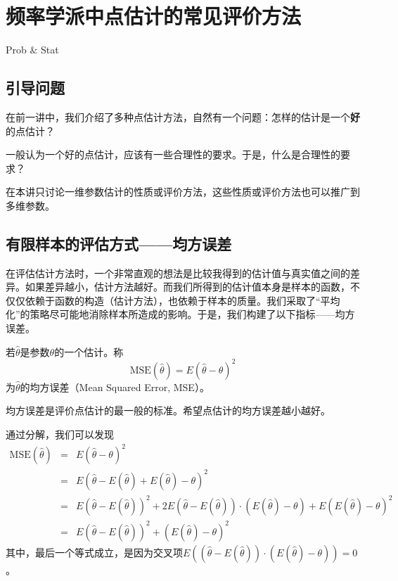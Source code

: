 \chapter{频率学派中点估计的常见评价方法}
\begin{introduction}
\item Prob $\&$ Stat 
\end{introduction}
\section{引导问题}
在前一讲中，我们介绍了多种点估计方法，自然有一个问题：怎样的估计是一个\textbf{好}的点估计？
	
一般认为一个好的点估计，应该有一些合理性的要求。于是，什么是合理性的要求？

\begin{remark}
    在本讲只讨论一维参数估计的性质或评价方法，这些性质或评价方法也可以推广到多维参数。
\end{remark}

\section{有限样本的评估方式——均方误差}

在评估估计方法时，一个非常直观的想法是比较我得到的估计值与真实值之间的差异。如果差异越小，估计方法越好。而我们所得到的估计值本身是样本的函数，不仅仅依赖于函数的构造（估计方法），也依赖于样本的质量。我们采取了“平均化”的策略尽可能地消除样本所造成的影响。于是，我们构建了以下指标——均方误差。

\begin{definition}[均方误差]
    若$\hat{\theta}$是参数$\theta$的一个估计。称
    $$
    \text{MSE}(\hat{\theta}) = E(\hat{\theta}-\theta)^2
    $$
    为$\hat{\theta}$的均方误差（Mean Squared Error, MSE）。
\end{definition}
\begin{remark}均方误差是评价点估计的最一般的标准。希望点估计的均方误差越小越好。
\end{remark}

通过分解，我们可以发现
\begin{eqnarray*}
\text{MSE}(\hat{\theta})&=& E(\hat{\theta}-\theta)^{2} \\
&=& E(\hat{\theta}-E(\hat{\theta})+E(\hat{\theta})-\theta)^{2} \\
&=& E(\hat{\theta}-E(\hat{\theta}))^{2}+2 E(\hat{\theta}-E(\hat{\theta})) \cdot(E(\hat{\theta})-\theta) +E(E(\hat{\theta})-\theta)^{2} 
\\
&=& E(\hat{\theta}-E(\hat{\theta}))^{2} +(E(\hat{\theta})-\theta)^{2} 
\end{eqnarray*}
其中，最后一个等式成立，是因为交叉项$E\left((\hat{\theta}-E(\hat{\theta})) \cdot(E(\hat{\theta})-\theta) \right)=0$。


